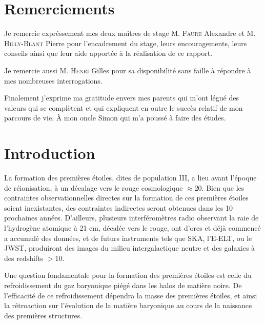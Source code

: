 \documentclass[10pt, a4paper]{report}
\numberwithin{equation}{subsection}
\begin{document}
\renewcommand{\contentsname}{Sommaire}
\renewcommand{\bibname}{Références}



\tableofcontents


\section*{Remerciements}
Je remercie expréssement mes deux maîtres de stage M. \textsc{Faure} Alexandre et M. \textsc{Hilly-Blant} Pierre pour l'encadrement du stage, leurs encouragements, leurs conseils ainsi que leur aide apportée à la réalisation de ce rapport.

Je remercie aussi M. \textsc{Henri} Gilles pour sa disponibilité sans faille à répondre à mes nombreuses interrogations.

Finalement j'exprime ma gratitude envers mes parents qui m'ont légué des valeurs qui se complètent et qui expliquent en outre le succès relatif de mon parcours de vie. À mon oncle Simon qui m'a poussé à faire des études.
 

\section*{Introduction}
La formation des premières étoiles, dites de population III, a lieu avant l'époque de réionisation, à un décalage vers le rouge cosmologique $\approx$20. Bien que les contraintes observationnelles directes sur la formation de ces premières étoiles soient inexistantes, des contraintes indirectes seront obtenues dans les 10 prochaines années. D'ailleurs, plusieurs interféromètres radio observant la raie de l'hydrogène atomique à 21 cm, décalée vers le rouge, ont d'ores et déjà commencé a accumulé des données, et de futurs instruments tels que SKA, l'E-ELT, ou le JWST, produiront des images du milieu intergalactique neutre et des galaxies à des redshifts $>$10.

Une question fondamentale pour la formation des premières étoiles est celle du refroidissement du gaz baryonique piégé dans les halos de matière noire. De l'efficacité de ce refroidissement dépendra la masse des premières étoiles, et ainsi la rétroaction sur l'évolution de la matière baryonique au cours de la naissance des premières structures. 
\end{document}
